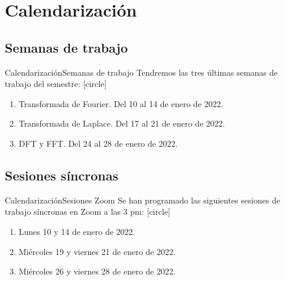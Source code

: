 \documentclass[10pt]{beamer}
\begin{document}
\section{Calendarización}
\subsection{Semanas de trabajo}

\begin{frame}{Calendarización}{Semanas de trabajo}
Tendremos las tres últimas semanas de trabajo del semestre:
[circle]
\begin{enumerate}[<+->]
\item Transformada de Fourier. Del 10 al 14 de enero de 2022.
\item Transformada de Laplace. Del 17 al 21 de enero de 2022.
\item DFT y FFT. Del 24 al 28 de enero de 2022.
\end{enumerate}
\end{frame}

\subsection{Sesiones síncronas}

\begin{frame}{Calendarización}{Sesiones Zoom}
Se han programado las siguientes sesiones de trabajo síncronas en Zoom a las 3 pm:
[circle]
\begin{enumerate}[<+->]
\item Lunes 10 y 14 de enero de 2022.
\item Miércoles 19 y viernes 21 de enero de 2022.
\item Miércoles 26 y viernes 28 de enero de 2022.
\end{enumerate}
\end{frame}
\end{document}
